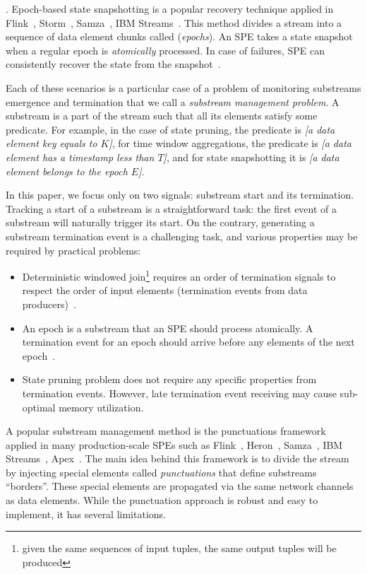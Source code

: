 . Epoch-based state snapshotting is a popular recovery technique applied in Flink~\cite{Carbone:2017:SMA:3137765.3137777}, Storm~\cite{Toshniwal:2014:STO:2588555.2595641}, Samza~\cite{Noghabi:2017:SSS:3137765.3137770}, IBM Streams~\cite{jacques2016consistent}. This method divides a stream into a sequence of data element chunks called ({\em epochs}). An SPE takes a state snapshot when a regular epoch is {\em atomically} processed. In case of failures, SPE can consistently recover the state from the snapshot~\cite{2015arXiv150608603C}. 

Each of these scenarios is a particular case of a problem of monitoring substreams emergence and termination that we call a {\em substream management problem}. A substream is a part of the stream such that all its elements satisfy some predicate. 
For example, in the case of state pruning, the predicate is {\em [a data element key equals to $K$]}, for time window aggregations, the predicate is {\em [a data element has a timestamp less than $T$]}, and for state snapshotting it is {\em [a data element belongs to the epoch $E$]}.

In this paper, we focus only on two signals: substream start and its termination. Tracking a start of a substream is a straightforward task: the first event of a substream will naturally trigger its start. On the contrary, generating a substream termination event is a challenging task, and various properties may be required by practical problems:
\begin{itemize}
    \item Deterministic windowed join\footnote{given the same sequences of input tuples, the same output tuples will be produced} requires an order of termination signals to respect the order of input elements (termination events from data producers)~\cite{najdataei2019stretch, gulisano2016scalejoin}.
    \item An epoch is a substream that an SPE should process atomically. A termination event for an epoch should arrive before any elements of the next epoch~\cite{2015arXiv150608603C}.
    \item State pruning problem does not require any specific properties from termination events. However, late termination event receiving may cause sub-optimal memory utilization.
\end{itemize}

A popular substream management method is the punctuations framework~\cite{tucker2003exploiting} applied in many production-scale SPEs such as Flink~\cite{carbone2015apache}, Heron~\cite{Kulkarni:2015:THS:2723372.2742788}, Samza~\cite{Noghabi:2017:SSS:3137765.3137770}, IBM Streams~\cite{jacques2016consistent}, Apex~\cite{pathak2016introduction}. The main idea behind this framework is to divide the stream by injecting special elements called {\em punctuations} that define substreams ``borders''. These special elements are propagated via the same network channels as data elements. While the punctuation approach is robust and easy to implement, it has several limitations. 

